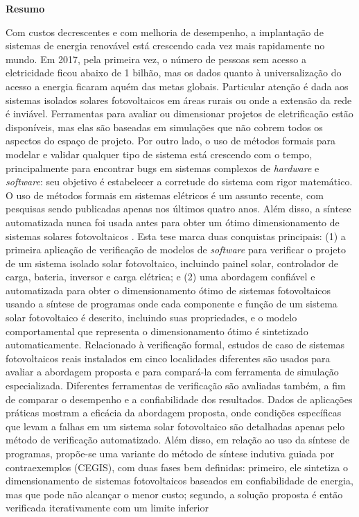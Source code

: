 \thispagestyle{plain}
\begin{center}
%    
%    
%    
    \vspace{0.9cm}
    \textbf{Resumo}
\end{center}
Com custos decrescentes e com melhoria de desempenho, a implantação de sistemas de energia renovável está crescendo cada vez mais rapidamente no mundo. Em 2017, pela primeira vez, o número de pessoas sem acesso a eletricidade ficou abaixo de 1 bilhão, mas os dados quanto à universalização do acesso a energia ficaram aquém das metas globais. Particular atenção é dada aos sistemas isolados solares fotovoltaicos em áreas rurais ou onde a extensão da rede é inviável. Ferramentas para avaliar ou dimensionar projetos de eletrificação estão disponíveis, mas elas são baseadas em simulações que não cobrem todos os aspectos do espaço de projeto. Por outro lado, o uso de métodos formais para modelar e validar qualquer tipo de sistema está crescendo com o tempo, principalmente para encontrar bugs em sistemas complexos de \textit{hardware} e \textit{software}: seu objetivo é estabelecer a corretude do sistema com rigor matemático. O uso de métodos formais em sistemas elétricos é um assunto recente, com pesquisas sendo publicadas apenas nos últimos quatro anos. Além disso, a síntese automatizada nunca foi usada antes para obter um ótimo dimensionamento de sistemas solares fotovoltaicos . Esta tese marca duas conquistas principais: (1) a primeira aplicação de verificação de modelos de \textit{software} para verificar o projeto de um sistema isolado solar fotovoltaico, incluindo painel solar, controlador de carga, bateria, inversor e carga elétrica; e (2) uma abordagem confiável e automatizada para obter o dimensionamento ótimo de sistemas fotovoltaicos usando a síntese de programas onde cada componente e função de um sistema solar fotovoltaico é descrito, incluindo suas propriedades, e o modelo comportamental que representa o dimensionamento ótimo é sintetizado automaticamente. Relacionado à verificação formal, estudos de caso de sistemas fotovoltaicos reais instalados em cinco localidades diferentes são usados para avaliar a abordagem proposta e para compará-la com ferramenta de simulação especializada. Diferentes ferramentas de verificação são avaliadas também, a fim de comparar o desempenho e a confiabilidade dos resultados. Dados de aplicações práticas mostram a eficácia da abordagem proposta, onde condições específicas que levam a falhas em um sistema solar fotovoltaico são detalhadas apenas pelo método de verificação automatizado. Além disso, em relação ao uso da síntese de programas, propõe-se uma variante do método de síntese indutiva guiada por contraexemplos (CEGIS), com duas fases bem definidas: primeiro, ele sintetiza o dimensionamento de sistemas fotovoltaicos baseados em confiabilidade de energia, mas que pode não alcançar o menor custo; segundo, a solução proposta é então verificada iterativamente com um limite inferior 